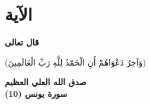 \chapter*{الآية}

\begin{Large}
	\textbf{قال تعالى}
	\begin{center}
		‎‏(وَآخِرُ دَعْوَاهُمْ أَنِ الْحَمْدُ لِلَّهِ رَبِّ الْعَالَمِينَ) 
	\end{center}
	\begin{flushleft}
		\textbf{صدق الله العلي العظيم}\\
		\noindent
		\textbf{سورة يونس (10)}
	\end{flushleft}
	
\end{Large}


